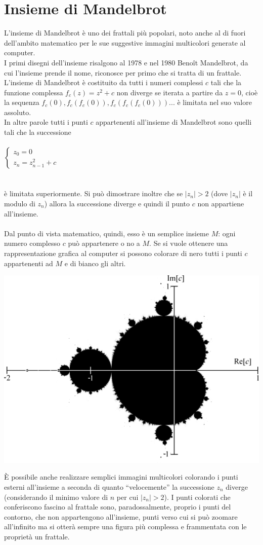 \documentclass[10pt]{report}
\begin{document}
		\section{Insieme di Mandelbrot}
			L'insieme di Mandelbrot è uno dei frattali più popolari, noto anche al di fuori dell'ambito matematico per le sue suggestive immagini multicolori generate al computer. \\
			I primi disegni dell'insieme risalgono al 1978 e nel 1980 Benoît Mandelbrot, da cui l'insieme prende il nome, riconosce per primo che si tratta di un frattale.\\
			L'insieme di Mandelbrot è costituito da tutti i numeri complessi $c$ tali che la funzione complessa $f_c(z) = z^2 + c$ non diverge se iterata a partire da $z=0$, cioè la sequenza $f_c(0), f_c(f_c(0)), f_c(f_c(f_c(0)))...$ è limitata nel suo valore assoluto.\\
			In altre parole tutti i punti $c$ appartenenti all'insieme di Mandelbrot sono quelli tali che la successione\\\\
			$
			\begin{cases}
				z_0 = 0 \\
				z_n = z_{n-1}^2 + c 
			\end{cases}
			$\\\\\\
			è limitata superiormente. Si può dimostrare inoltre che se $|z_n| > 2$ (dove $|z_n|$ è il modulo di $z_n$) allora la successione diverge e quindi il punto $c$ non appartiene all'insieme. \\\\
			Dal punto di vista matematico, quindi, esso è un semplice insieme $M$: ogni numero complesso $c$ può appartenere o no a $M$. Se si vuole ottenere una rappresentazione grafica al computer si possono colorare di nero tutti i punti $c$ appartenenti ad $M$ e di bianco gli altri.
			\begin{center}
				\includegraphics[width=0.5\linewidth]{"Insieme di Mandelbrot/Mandelset_hires"}
			\end{center}
			\`E possibile anche realizzare semplici immagini multicolori colorando i punti esterni all'insieme a seconda di quanto ``velocemente'' la successione $z_n$ diverge (considerando il minimo valore di $n$ per cui $|z_n| > 2$). I punti colorati che conferiscono fascino al frattale sono, paradossalmente, proprio i punti del contorno, che non appartengono all'insieme, punti verso cui si può zoomare all'infinito ma si otterà sempre una figura più complessa e frammentata con le proprietà  un frattale.
\end{document}
